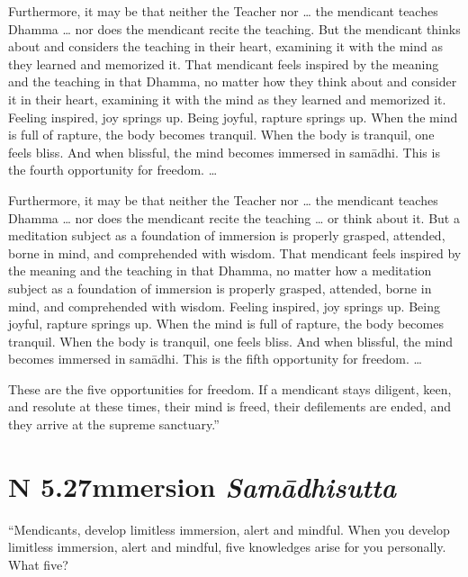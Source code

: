 \documentclass[12pt,openany]{book}%
\newcommand*{\suttatitleacronym}[1]{\smaller[2]{#1}\vspace*{.3em}}
\newcommand*{\suttatitletranslation}[1]{\linebreak{#1}}
\newcommand*{\suttatitleroot}[1]{\linebreak\smaller[2]\itshape{#1}}
\newcommand*{\tocacronym}[1]{\hspace*{-3.3em}{#1}\quad}
\newcommand*{\toctranslation}[1]{#1}
\newcommand*{\tocroot}[1]{(\textit{#1})}
\begin{document}
Furthermore, it may be that neither the Teacher nor … the mendicant teaches Dhamma … nor does the mendicant recite the teaching. But the mendicant thinks about and considers the teaching in their heart, examining it with the mind as they learned and memorized it. That mendicant feels inspired by the meaning and the teaching in that Dhamma, no matter how they think about and consider it in their heart, examining it with the mind as they learned and memorized it. Feeling inspired, joy springs up. Being joyful, rapture springs up. When the mind is full of rapture, the body becomes tranquil. When the body is tranquil, one feels bliss. And when blissful, the mind becomes immersed in \textsanskrit{samādhi}. This is the fourth opportunity for freedom. … 

Furthermore, it may be that neither the Teacher nor … the mendicant teaches Dhamma … nor does the mendicant recite the teaching … or think about it. But a meditation subject as a foundation of immersion is properly grasped, attended, borne in mind, and comprehended with wisdom. That mendicant feels inspired by the meaning and the teaching in that Dhamma, no matter how a meditation subject as a foundation of immersion is properly grasped, attended, borne in mind, and comprehended with wisdom. Feeling inspired, joy springs up. Being joyful, rapture springs up. When the mind is full of rapture, the body becomes tranquil. When the body is tranquil, one feels bliss. And when blissful, the mind becomes immersed in \textsanskrit{samādhi}. This is the fifth opportunity for freedom. … 

These are the five opportunities for freedom. If a mendicant stays diligent, keen, and resolute at these times, their mind is freed, their defilements are ended, and they arrive at the supreme sanctuary.” 

%
\section*{{\suttatitleacronym AN 5.27}{\suttatitletranslation Immersion }{\suttatitleroot Samādhisutta}}
\addcontentsline{toc}{section}{\tocacronym{AN 5.27} \toctranslation{Immersion } \tocroot{Samādhisutta}}

“Mendicants, develop limitless immersion, alert and mindful. When you develop limitless immersion, alert and mindful, five knowledges arise for you personally. What five? 
\end{document}
